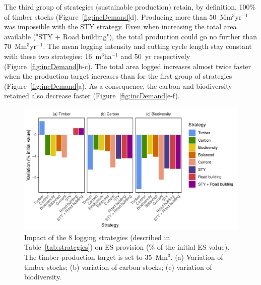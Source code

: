 \documentclass{article}
\begin{document}
The third group of strategies (sustainable production) retain, by definition, 100\% of timber stocks (Figure~\ref{fig:incDemand}d). Producing more than 50~Mm$^3$yr$^{-1}$ was impossible with the STY strategy. Even when increasing the total area available ("STY + Road building"), the total production could go no further than 70~Mm$^3$yr$^{-1}$. 
The mean logging intensity and cutting cycle length stay constant with these two strategies: 16~m$^3$ha$^{-1}$ and 50~yr respectively (Figure~\ref{fig:incDemand}b-c). The total area logged increases almost twice faster when the production target increases than for the first group of strategies (Figure~\ref{fig:incDemand}a). As a consequence, the carbon and biodiversity retained also decrease faster (Figure~\ref{fig:incDemand}e-f). 

\begin{figure}
    \centering
    \includegraphics[width=\linewidth]{graphs/costsScenario}
    \caption{Impact of the 8 logging strategies (described in Table~\ref{tab:strategies}) on ES provision (\% of the initial ES value). The timber production target is set to 35~Mm$^3$. (a) Variation of timber stocks; (b) variation of carbon stocks; (c) variation of biodiversity.}
    \label{fig:scenESProv}
\end{figure}
\end{document}
